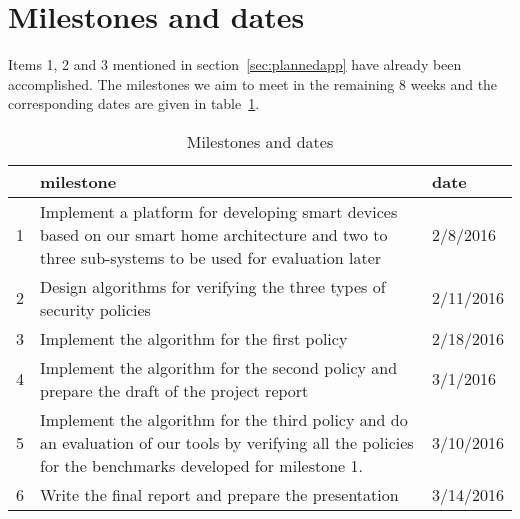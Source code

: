 \documentclass{article}
\begin{document}
\section{Milestones and dates}
Items 1, 2 and 3 mentioned in section~\ref{sec:plannedapp} have already been accomplished. 
The milestones we aim to meet in the remaining 8 weeks and the corresponding dates are given in table~\ref{table:milestone}.
\begin{table}[h]
\begin{center}
\begin{tabular}{|p{1cm}|p{5cm}|p{2cm}|}
\hline 
 & milestone & date \\ \hline
1 & Implement a platform for developing smart devices based on our smart home architecture and  two to three sub-systems to be used for evaluation later & 2/8/2016 \\\hline
2 & Design algorithms for verifying the three types of security policies & 2/11/2016 \\\hline
3 & Implement the algorithm for the first policy & 2/18/2016 \\\hline
4 & Implement the algorithm for the second policy and prepare the draft of the project report & 3/1/2016  \\\hline
5 & Implement the algorithm for the third policy and do an evaluation of our tools by verifying all the policies for the benchmarks developed for milestone 1. & 3/10/2016 \\\hline
6 & Write the final report and prepare the presentation & 3/14/2016 \\\hline
\end{tabular}
\end{center}
\caption{Milestones and dates}
\label{table:milestone}
\end{table}




\end{document}
